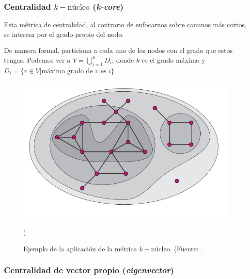 \documentclass[../main.tex]{subfiles}
\begin{document}
\subsubsection{Centralidad $k-\text{núcleo}$ (\textit{k-core}) }

Esta métrica de centralidad, al contrario de enfocarnos sobre caminos más cortos, se interesa por el grado propio del nodo.

De manera formal, particiona a cada uno de los nodos con el grado que estos tengas. Podemos ver a $V = \bigcup_{i=1}^{k} D_i $, donde $k$ es el grado máximo y $D_{i} = \{ v \in V | \text{máximo grado de $v$ es } i \}$

\begin{figure}
    \centering
    \includegraphics[scale = 0.5]{images/marcoteorico_kcore.png}
    \caption{Ejemplo de la aplicación de la métrica $k-\text{núcleo}$. (Fuente:  \cite{DBLP:journals/corr/cs-DS-0310049}.}
    \label{fig:my_label})
\end{figure}






\subsubsection{Centralidad de vector propio (\textit{eigenvector}) }
\end{document}
